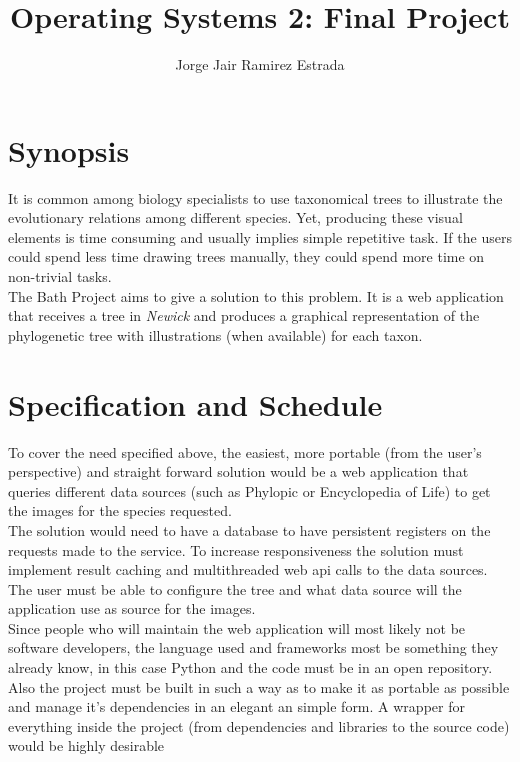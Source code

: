 \documentclass[10pt]{article}
\author{Jorge Jair Ramirez Estrada}
\title{Operating Systems 2: Final Project}
\begin{document}
\maketitle

\section{Synopsis}
It is common among biology specialists to use taxonomical trees to illustrate the evolutionary relations among different species. Yet, producing these visual elements is time consuming and usually implies simple repetitive task. If the users could spend less time drawing trees manually, they could spend more time on non-trivial tasks.\\

The Bath Project aims to give a solution to this problem. It is a web application that receives a tree in \textit{Newick} and produces a graphical representation of the phylogenetic tree with illustrations (when available) for each taxon.

\section{Specification and Schedule}
To cover the need specified above, the easiest, more portable (from the user's perspective) and straight forward solution would be a web application that queries different data sources (such as Phylopic or Encyclopedia of Life) to get the images for the species requested.\\

The solution would need to have a database to have persistent registers on the requests made to the service. To increase responsiveness the solution must implement result caching and multithreaded web api calls to the data sources. The user must be able to configure the tree and what data source will the application use as source for the images.\\

Since people who will maintain the web application will most likely not be software developers, the language used and frameworks most be something they already know, in this case Python and the code must be in an open repository. Also the project must be built in such a way as to make it as portable as possible and manage it's dependencies in an elegant an simple form. A wrapper for everything inside the project (from dependencies and libraries to the source code) would be highly desirable
\end{document}
